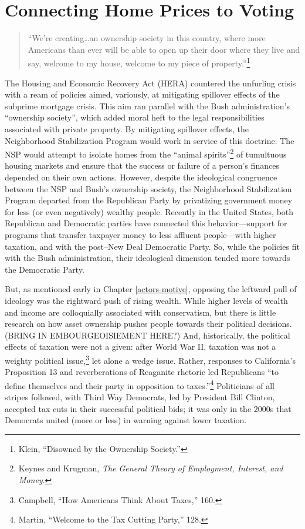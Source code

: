 \documentclass[
]{article}
\author{}
\date{\vspace{-2.5em}}
\begin{document}
{
\setcounter{tocdepth}{2}
\tableofcontents
}
\hypertarget{motive-opportunity}{%
\section{Connecting Home Prices to Voting}\label{motive-opportunity}}

\begin{quote}
``We're creating\ldots an ownership society in this country, where more Americans than ever will be able to open up their door where they live and say, welcome to my house, welcome to my piece of property.''\footnote{Klein, ``Disowned by the Ownership Society.''}
\end{quote}

The Housing and Economic Recovery Act (HERA) countered the unfurling crisis with a ream of policies aimed, variously, at mitigating spillover effects of the subprime mortgage crisis.
This aim ran parallel with the Bush administration's ``ownership society'', which added moral heft to the legal responsibilities associated with private property.
By mitigating spillover effects, the Neighborhood Stabilization Program would work in service of this doctrine.
The NSP would attempt to isolate homes from the ``animal spirits''\footnote{Keynes and Krugman, \emph{The General Theory of Employment, Interest, and Money}.} of tumultuous housing markets and ensure that the success or failure of a person's finances depended on their own actions.
However, despite the ideological congruence between the NSP and Bush's ownership society, the Neighborhood Stabilization Program departed from the Republican Party by privatizing government money for less (or even negatively) wealthy people.
Recently in the United States, both Republican and Democratic parties have connected this behavior---support for programs that transfer taxpayer money to less affluent people---with higher taxation, and with the post--New Deal Democratic Party.
So, while the policies fit with the Bush administration, their ideological dimension tended more towards the Democratic Party.

But, as mentioned early in Chapter \ref{actors-motive}, opposing the leftward pull of ideology was the rightward push of rising wealth.
While higher levels of wealth and income are colloquially associated with conservatism, but there is little research on how asset ownership pushes people towards their political decisions.(BRING IN EMBOURGEOISIEMENT HERE?)
And, historically, the political effects of taxation were not a given: after World War II, taxation was not a weighty political issue,\footnote{Campbell, ``How Americans Think About Taxes,'' 160.} let alone a wedge issue.
Rather, responses to California's Proposition 13 and reverberations of Reaganite rhetoric led Republicans ``to define themselves and their party in opposition to taxes.''\footnote{Martin, ``Welcome to the Tax Cutting Party,'' 128.}
Politicians of all stripes followed, with Third Way Democrats, led by President Bill Clinton, accepted tax cuts in their successful political bids; it was only in the 2000s that Democrats united (more or less) in warning against lower taxation.
\end{document}
